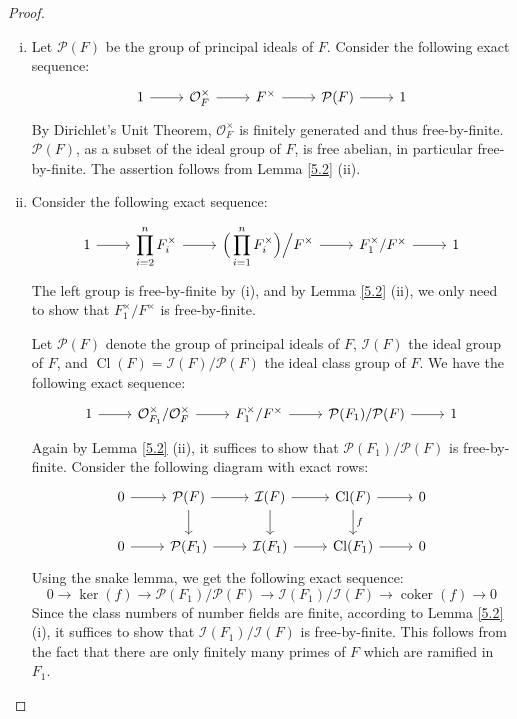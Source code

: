 \begin{proof}
\begin{enumerate}[(i)]
\item Let $\mathcal{P}(F)$ be the group of principal ideals of $F$. Consider the following exact sequence:
\[ \begin{tikzcd}
1 \ar[r] & \mathcal{O}_F^\times \ar[r] & F^\times \ar[r]& \mathcal{P}(F) \ar[r] & 1
\end{tikzcd} \]
By Dirichlet's Unit Theorem, $\mathcal{O}_F^\times$ is finitely generated and thus free-by-finite. $\mathcal{P}(F)$, as a subset of the ideal group of $F$, is free abelian, in particular free-by-finite. The assertion follows from Lemma \ref{5.2} (ii).
\item Consider the following exact sequence:
\[ \begin{tikzcd}
1 \ar[r] & \displaystyle \prod_{i=2}^{n} F_i^\times \ar[r]& \displaystyle \Big(\prod_{i=1}^{n}F_i^\times\Big)\Big/F^\times \ar[r]& F_1^\times/F^\times \ar[r]& 1
\end{tikzcd} \]
The left group is free-by-finite by (i), and by Lemma \ref{5.2} (ii), we only need to show that $F_1^\times/F^\times$ is free-by-finite.

Let $\mathcal{P}(F)$ denote the group of principal ideals of $F$, $\mathcal{I}(F)$ the ideal group of $F$, and $\operatorname{Cl}(F) = \mathcal{I}(F)/\mathcal{P}(F)$ the ideal class group of $F$. We have the following exact sequence:
\[ \begin{tikzcd}
1 \ar[r]& \mathcal{O}_{F_1}^\times /\mathcal{O}_F^\times\ar[r] & F_1^\times / F^\times\ar[r] & \mathcal{P}(F_1)/\mathcal{P}(F)\ar[r] & 1
\end{tikzcd} \]
Again by Lemma \ref{5.2} (ii), it suffices to show that $\mathcal{P}(F_1)/\mathcal{P}(F)$ is free-by-finite. 
Consider the following diagram with exact rows:
\[ \begin{tikzcd}
0\ar[r] & \mathcal{P}(F) \ar[d] \ar[r]& \mathcal{I}(F) \ar[r]\ar[d]& \operatorname{Cl}(F)\ar[r]\ar[d, "f"] & 0\\
0 \ar[r]& \mathcal{P}(F_1) \ar[r]& \mathcal{I}(F_1) \ar[r]& \operatorname{Cl}(F_1) \ar[r]& 0 
\end{tikzcd} \]
Using the snake lemma, we get the following exact sequence:
\[
0 \longrightarrow \ker(f)\longrightarrow \mathcal{P}(F_1)/\mathcal{P}(F)\longrightarrow \mathcal{I}(F_1)/\mathcal{I}(F)
\longrightarrow \operatorname{coker}(f)\longrightarrow 0 \]
Since the class numbers of number fields are finite, according to Lemma \ref{5.2} (i), it suffices to show that $\mathcal{I}(F_1)/\mathcal{I}(F)$ is free-by-finite. This follows from the fact that there are only finitely many primes of $F$ which are ramified in $F_1$.\qedhere
\end{enumerate}
\end{proof}

